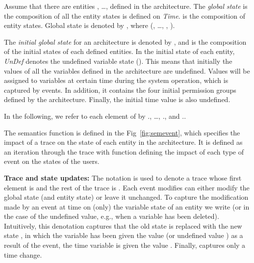 \documentclass[a4paper]{article}
\begin{document}
\begin{center}
\noindent{}
\end{center}

Assume that there are  entities , \dots,  defined in the architecture. The \textit{global state} is the composition of all the entity states is defined on   \textit{Time}.  is the composition of  entity states. Global state is denoted by , where   (, \dots, , ). 

\begin{center}
\noindent{}
\end{center}

The \textit{initial global state} for an architecture  is denoted by , and is the composition of the initial states of each defined entities. In the initial state of each entity, \textit{UnDef} denotes the undefined variable state (). This means that initially the values of all the variables defined in the architecture are undefined. Values will be assigned to variables at certain time during the system operation, which is captured by events. In addition, it contains the four initial permission groups defined by the architecture. Finally, the initial time value is also undefined.

\begin{center}
\noindent{}
\end{center}

In the following, we refer to each element of  by ., \dots, ., and .. 


The semantics function  is defined in the Fig~\ref{fig:semevent}, which specifies the impact of a trace on the state of each entity  in the architecture. It is defined as an iteration through the trace with function  defining the impact of each type of event on the states of the users. 

\textbf{Trace and state updates:} The notation  is used to denote a trace whose first element is  and the rest of the trace is . Each event modifies can either modify the global state (and entity state) or leave it unchanged. To capture the modification made by an event at time  on (only) the variable state of an entity  we write  (or  in the case of the undefined value, e.g., when a variable has been deleted). Intuitively, this denotation captures that the old state  is replaced with the new state , in which the variable  has been given the value  (or undefined value ) as a result of the event, the time   variable is given the value . Finally,  captures only a time change. 
\end{document}
